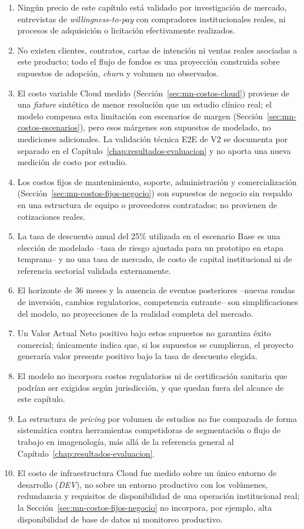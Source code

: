 \begin{enumerate}
    \item Ningún precio de este capítulo está validado por investigación de mercado, entrevistas de \textit{willingness-to-pay} con compradores institucionales reales, ni procesos de adquisición o licitación efectivamente realizados.
    \item No existen clientes, contratos, cartas de intención ni ventas reales asociadas a este producto; todo el flujo de fondos es una proyección construida sobre supuestos de adopción, \textit{churn} y volumen no observados.
    \item El costo variable Cloud medido (Sección~\ref{sec:mn-costos-cloud}) proviene de una \textit{fixture} sintética de menor resolución que un estudio clínico real; el modelo compensa esta limitación con escenarios de margen (Sección~\ref{sec:mn-costos-escenarios}), pero esos márgenes son supuestos de modelado, no mediciones adicionales. La validación técnica E2E de V2 se documenta por separado en el Capítulo~\ref{chap:resultados-evaluacion} y no aporta una nueva medición de costo por estudio.
    \item Los costos fijos de mantenimiento, soporte, administración y comercialización (Sección~\ref{sec:mn-costos-fijos-negocio}) son supuestos de negocio sin respaldo en una estructura de equipo o proveedores contratados; no provienen de cotizaciones reales.
    \item La tasa de descuento anual del 25\% utilizada en el escenario Base es una elección de modelado --tasa de riesgo ajustada para un prototipo en etapa temprana-- y no una tasa de mercado, de costo de capital institucional ni de referencia sectorial validada externamente.
    \item El horizonte de 36 meses y la ausencia de eventos posteriores --nuevas rondas de inversión, cambios regulatorios, competencia entrante-- son simplificaciones del modelo, no proyecciones de la realidad completa del mercado.
    \item Un Valor Actual Neto positivo bajo estos supuestos no garantiza éxito comercial; únicamente indica que, si los supuestos se cumplieran, el proyecto generaría valor presente positivo bajo la tasa de descuento elegida.
    \item El modelo no incorpora costos regulatorios ni de certificación sanitaria que podrían ser exigidos según jurisdicción, y que quedan fuera del alcance de este capítulo.
    \item La estructura de \textit{pricing} por volumen de estudios no fue comparada de forma sistemática contra herramientas competidoras de segmentación o flujo de trabajo en imagenología, más allá de la referencia general al Capítulo~\ref{chap:resultados-evaluacion}.
    \item El costo de infraestructura Cloud fue medido sobre un único entorno de desarrollo (\textit{DEV}), no sobre un entorno productivo con los volúmenes, redundancia y requisitos de disponibilidad de una operación institucional real; la Sección~\ref{sec:mn-costos-fijos-negocio} no incorpora, por ejemplo, alta disponibilidad de base de datos ni monitoreo productivo.
\end{enumerate}


